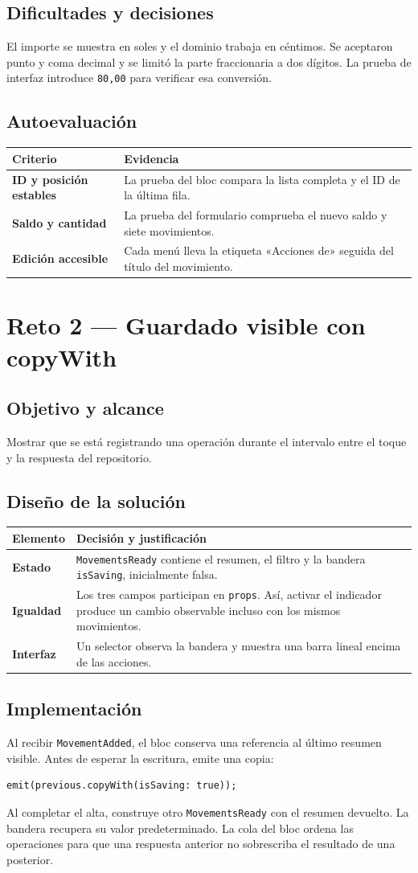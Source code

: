 \documentclass[11pt,letterpaper]{article}
\makeatletter
\newcommand{\tabla}[2]{\par\smallskip\begin{tabularx}{\linewidth}{@{}>{\bfseries\color{vino}}p{.28\linewidth}X@{}}\toprule\rowcolor{rosa}#1\\\midrule #2\bottomrule\end{tabularx}\par}
\newcommand{\ruta}[1]{\nolinkurl{#1}}
\makeatother
\begin{document}
\subsection{Dificultades y decisiones}
El importe se muestra en soles y el dominio trabaja en céntimos. Se aceptaron punto y coma decimal y se limitó la parte fraccionaria a dos dígitos. La prueba de interfaz introduce \texttt{80,00} para verificar esa conversión.
\subsection{Autoevaluación}
\tabla{Criterio & Evidencia}{ID y posición estables & La prueba del bloc compara la lista completa y el ID de la última fila.\\Saldo y cantidad & La prueba del formulario comprueba el nuevo saldo y siete movimientos.\\Edición accesible & Cada menú lleva la etiqueta «Acciones de» seguida del título del movimiento.\\}
\newpage
\section{Reto 2 — Guardado visible con copyWith}
\subsection{Objetivo y alcance}
Mostrar que se está registrando una operación durante el intervalo entre el toque y la respuesta del repositorio.
\subsection{Diseño de la solución}
\tabla{Elemento & Decisión y justificación}{Estado & \ruta{MovementsReady} contiene el resumen, el filtro y la bandera \texttt{isSaving}, inicialmente falsa.\\Igualdad & Los tres campos participan en \texttt{props}. Así, activar el indicador produce un cambio observable incluso con los mismos movimientos.\\Interfaz & Un selector observa la bandera y muestra una barra lineal encima de las acciones.\\}
\subsection{Implementación}
Al recibir \texttt{MovementAdded}, el bloc conserva una referencia al último resumen visible. Antes de esperar la escritura, emite una copia:
\begin{verbatim}
emit(previous.copyWith(isSaving: true));
\end{verbatim}
Al completar el alta, construye otro \texttt{MovementsReady} con el resumen devuelto. La bandera recupera su valor predeterminado. La cola del bloc ordena las operaciones para que una respuesta anterior no sobrescriba el resultado de una posterior.
\end{document}
